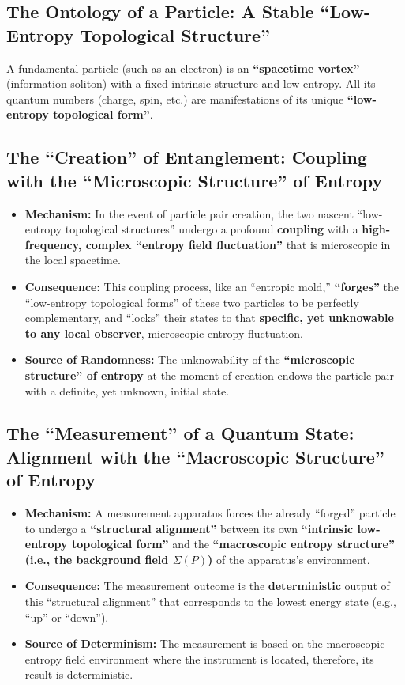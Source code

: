 \documentclass[11pt]{article}
\begin{document}
\subsection{The Ontology of a Particle: A Stable ``Low-Entropy Topological Structure''}
A fundamental particle (such as an electron) is an \textbf{``spacetime vortex''} (information soliton) with a fixed intrinsic structure and low entropy. All its quantum numbers (charge, spin, etc.) are manifestations of its unique \textbf{``low-entropy topological form''}.

\subsection{The ``Creation'' of Entanglement: Coupling with the ``Microscopic Structure'' of Entropy}
\begin{itemize}
    \item   \textbf{Mechanism:} In the event of particle pair creation, the two nascent ``low-entropy topological structures'' undergo a profound \textbf{coupling} with a \textbf{high-frequency, complex ``entropy field fluctuation''} that is microscopic in the local spacetime.
    \item   \textbf{Consequence:} This coupling process, like an ``entropic mold,'' \textbf{``forges''} the ``low-entropy topological forms'' of these two particles to be perfectly complementary, and ``locks'' their states to that \textbf{specific, yet unknowable to any local observer}, microscopic entropy fluctuation.
    \item   \textbf{Source of Randomness:} The unknowability of the \textbf{``microscopic structure'' of entropy} at the moment of creation endows the particle pair with a definite, yet unknown, initial state.
\end{itemize}

\subsection{The ``Measurement'' of a Quantum State: Alignment with the ``Macroscopic Structure'' of Entropy}
\begin{itemize}
    \item   \textbf{Mechanism:} A measurement apparatus forces the already ``forged'' particle to undergo a \textbf{``structural alignment''} between its own \textbf{``intrinsic low-entropy topological form''} and the \textbf{``macroscopic entropy structure'' (i.e., the background field $\Sigma(P)$)} of the apparatus's environment.
    \item   \textbf{Consequence:} The measurement outcome is the \textbf{deterministic} output of this ``structural alignment'' that corresponds to the lowest energy state (e.g., ``up'' or ``down'').
    \item   \textbf{Source of Determinism:} The measurement is based on the macroscopic entropy field environment where the instrument is located, therefore, its result is deterministic.
\end{itemize}
\end{document}
